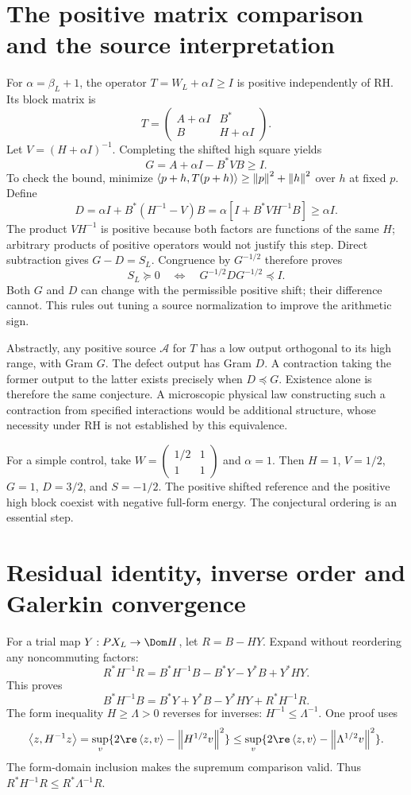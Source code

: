 \section{The positive matrix comparison and the source interpretation}
For $\alpha=\beta_L+1$, the operator $T=W_L+\alpha I\ge I$ is positive
independently of RH. Its block matrix is
\[
T=\begin{pmatrix}A+\alpha I&B^*\\B&H+\alpha I\end{pmatrix}.
\]
Let $V=(H+\alpha I)^{-1}$. Completing the shifted high square yields
\[
G=A+\alpha I-B^*VB\ge I.
\]
To check the bound, minimize $\left\langle p+h,T(p+h)\right\rangle\ge\left\lVert p\right\rVert^2+\left\lVert h\right\rVert^2$
over $h$ at fixed $p$. Define
\[
D=\alpha I+B^*(H^{-1}-V)B
=\alpha[I+B^*VH^{-1}B]\ge\alpha I.
\]
The product $VH^{-1}$ is positive because both factors are functions of
the same $H$; arbitrary products of positive operators would not justify
this step. Direct subtraction gives $G-D=S_L$. Congruence by $G^{-1/2}$
therefore proves
\begin{equation}\label{d:contraction}
S_L\succeq0\quad\Longleftrightarrow\quad
G^{-1/2}DG^{-1/2}\preceq I.
\end{equation}
Both $G$ and $D$ can change with the permissible positive shift; their
difference cannot. This rules out tuning a source normalization to improve
the arithmetic sign.

Abstractly, any positive source $\mathcal A$ for $T$ has a low output
orthogonal to its high range, with Gram $G$. The defect output has Gram
$D$. A contraction taking the former output to the latter exists precisely
when $D\preceq G$. Existence alone is therefore the same conjecture.
A microscopic physical law constructing such a contraction from specified
interactions would be additional structure, whose necessity under RH
is not established by this equivalence.

For a simple control, take
$W=\left(\begin{smallmatrix}1/2&1\\1&1\end{smallmatrix}\right)$ and
$\alpha=1$. Then $H=1$, $V=1/2$, $G=1$, $D=3/2$, and $S=-1/2$.
The positive shifted reference and the positive high block coexist with
negative full-form energy. The conjectural ordering is an essential step.

\section{Residual identity, inverse order and Galerkin convergence}
For a trial map $Y:PX_L\to\Dom H$, let $R=B-HY$. Expand without
reordering any noncommuting factors:
\[
R^*H^{-1}R=B^*H^{-1}B-B^*Y-Y^*B+Y^*HY.
\]
This proves
\begin{equation}\label{d:residual}
B^*H^{-1}B=B^*Y+Y^*B-Y^*HY+R^*H^{-1}R.
\end{equation}
The form inequality $H\ge\Lambda>0$ reverses for inverses:
$H^{-1}\le\Lambda^{-1}$. One proof uses
\[
\ip z{H^{-1}z}=\sup_v\{2\re\ip z v-\norm{H^{1/2}v}^2\}
\le\sup_v\{2\re\ip z v-\norm{\Lambda^{1/2}v}^2\}.
\]
The form-domain inclusion makes the supremum comparison valid.
Thus $R^*H^{-1}R\le R^*\Lambda^{-1}R$.

